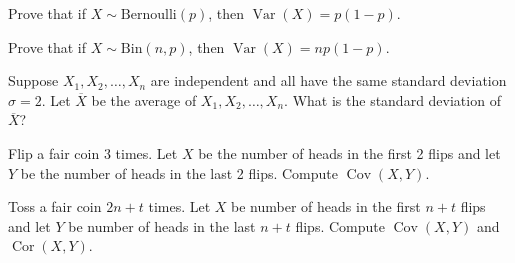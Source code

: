 \documentclass[10pt, a5paper]{scrartcl}
\DeclareMathOperator{\var}{Var}
\DeclareMathOperator{\cov}{Cov}
\DeclareMathOperator{\cor}{Cor}
\begin{document}
\boardquestions


\begin{exercise}[Variances]
	\begin{subex}
		Prove that if $X \sim \text{Bernoulli}(p)$, then $\var(X)= p(1-p)$.
	\end{subex}
	
	\begin{subex}
		Prove that if $X \sim \text{Bin}(n, p)$, then $\var(X)= np(1-p)$.
	\end{subex}
	
	\begin{subex}
		Suppose $X_1, X_2, \ldots, X_n$ are independent and all have the same standard deviation $\sigma=2$. 
		Let $\overline{X}$ be the average of $X_1, X_2, \ldots, X_n$. What is the standard deviation of $\overline{X}$?
	\end{subex}
\end{exercise}


\begin{exercise}[Covariance]
	Flip a fair coin 3 times. Let $X$ be the number of heads in the first 2 flips and let $Y$ be the number of heads in the last 2 flips. Compute $\cov(X,Y)$.
\end{exercise}


\begin{exercise}
Toss a fair coin $2n+t$ times. Let $X$ be number of heads in the first $n+t$ flips and let $Y$ be number of heads in the last $n+t$ flips. Compute $\cov(X,Y)$ and $\cor(X,Y)$.	
\end{exercise}


\vfill
{}
\end{document}
